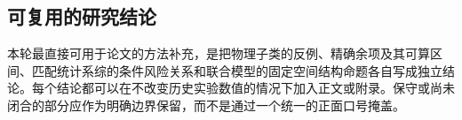 \subsection{可复用的研究结论}
本轮最直接可用于论文的方法补充，是把物理子类的反例、精确余项及其可算区间、匹配统计系综的条件风险关系和联合模型的固定空间结构命题各自写成独立结论。每个结论都可以在不改变历史实验数值的情况下加入正文或附录。保守或尚未闭合的部分应作为明确边界保留，而不是通过一个统一的正面口号掩盖。

